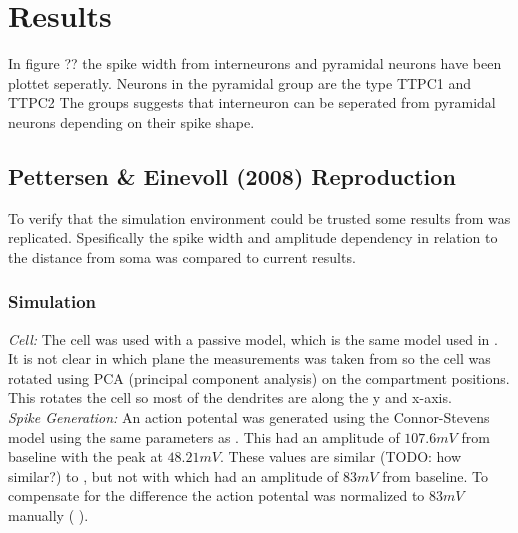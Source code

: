\documentclass[altfont, fleqn]{uiophd}
\renewcommand{\cref}[1]{{\color{viridis_03}\mycref{#1}} }
\begin{document}


\chapter{Results}
In figure ?? the spike width from interneurons and pyramidal neurons have been
plottet seperatly. Neurons in the pyramidal group are the type TTPC1 and TTPC2 
The groups suggests that interneuron can be seperated from 
pyramidal neurons depending on their spike shape. 

\vspace{1em} 
\startcontents
{}

\section{Pettersen \& Einevoll (2008) Reproduction}
To verify that the simulation environment could be trusted 
some results from 
\textcite{pettersen_amplitude_2008} was replicated.
Spesifically the spike width and amplitude dependency in relation to 
the distance from soma was compared to current results. 


\subsection{Simulation}
\emph{Cell:}
The \textcite{mainen_influence_1996} cell was used with a passive model, which is 
the same model used in \textcite{pettersen_amplitude_2008}. 
It is not clear in which plane the measurements was taken from so 
the cell was rotated using PCA (principal component analysis) on the compartment
positions.
This rotates the cell so most of the dendrites are along
the y and x-axis. 
\\

\noindent\emph{Spike Generation:}
An action potental was generated using the Connor-Stevens model 
\cites{connor_prediction_1971, connor_neural_1977}
using the same parameters as \textcite{dayan_theoretical_2001}. 
This had an amplitude of $107.6mV$ from baseline with the peak at $48.21mV$. 
These values are similar (TODO: how similar?) to \textcite{dayan_theoretical_2001}, but not
with \textcite{pettersen_amplitude_2008} which had an amplitude of 
$83mV$ from baseline. To compensate for the difference the action potental was 
normalized to $83mV$ manually (\cref{fig:3_1_soma_mem}).
\\
\end{document}
